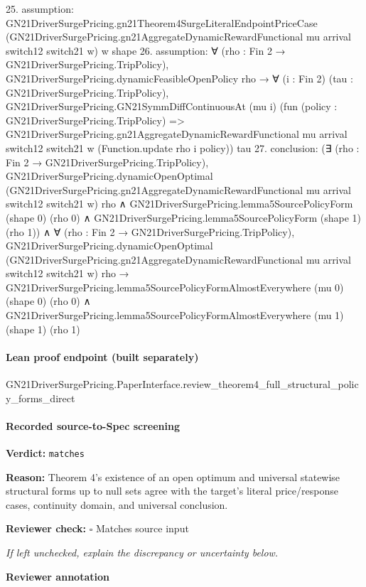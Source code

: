 \documentclass[10pt]{article}
\newcommand{\reviewerbox}{%
  \par\noindent\fbox{\parbox{0.96\linewidth}{\rule{0pt}{0.38in}}}\par
}
\newcommand{\reviewmatch}[1]{%
  \par\noindent\textbf{Reviewer check:} $\square$\; #1\par
  \noindent\emph{If left unchecked, explain the discrepancy or uncertainty below.}\par
}
\begin{document}
\begin{ReviewVerbatim}
25. assumption: GN21DriverSurgePricing.gn21Theorem4SurgeLiteralEndpointPriceCase
  (GN21DriverSurgePricing.gn21AggregateDynamicRewardFunctional mu arrival switch12 switch21 w) w shape
26. assumption: ∀ (rho : Fin 2 → GN21DriverSurgePricing.TripPolicy),
  GN21DriverSurgePricing.dynamicFeasibleOpenPolicy rho →
    ∀ (i : Fin 2) (tau : GN21DriverSurgePricing.TripPolicy),
      GN21DriverSurgePricing.GN21SymmDiffContinuousAt (mu i)
        (fun (policy : GN21DriverSurgePricing.TripPolicy) =>
          GN21DriverSurgePricing.gn21AggregateDynamicRewardFunctional mu arrival switch12 switch21 w
            (Function.update rho i policy))
        tau
27. conclusion: (∃ (rho : Fin 2 → GN21DriverSurgePricing.TripPolicy),
    GN21DriverSurgePricing.dynamicOpenOptimal
        (GN21DriverSurgePricing.gn21AggregateDynamicRewardFunctional mu arrival switch12 switch21 w) rho ∧
      GN21DriverSurgePricing.lemma5SourcePolicyForm (shape 0) (rho 0) ∧
        GN21DriverSurgePricing.lemma5SourcePolicyForm (shape 1) (rho 1)) ∧
  ∀ (rho : Fin 2 → GN21DriverSurgePricing.TripPolicy),
    GN21DriverSurgePricing.dynamicOpenOptimal
        (GN21DriverSurgePricing.gn21AggregateDynamicRewardFunctional mu arrival switch12 switch21 w) rho →
      GN21DriverSurgePricing.lemma5SourcePolicyFormAlmostEverywhere (mu 0) (shape 0) (rho 0) ∧
        GN21DriverSurgePricing.lemma5SourcePolicyFormAlmostEverywhere (mu 1) (shape 1) (rho 1)
\end{ReviewVerbatim}

\paragraph{Lean proof endpoint (built separately)}\begin{ReviewVerbatim}
GN21DriverSurgePricing.PaperInterface.review_theorem4_full_structural_policy_forms_direct
\end{ReviewVerbatim}

\paragraph{Recorded source-to-Spec screening}
\textbf{Verdict:} \texttt{matches}
\\
{\raggedright
\textbf{Reason:} Theorem 4's existence of an open optimum and universal statewise structural forms up to null sets agree with the target's literal price/\allowbreak{}response cases, continuity domain, and universal conclusion.\allowbreak{}
\par}
\reviewmatch{Matches source input}
\noindent\textbf{Reviewer annotation}\par
\reviewerbox
\clearpage
\hypertarget{source-claim-e4ff38b469e6cc30}{}
\hypertarget{source-section-62736bb95a656bbc}{}
\end{document}
